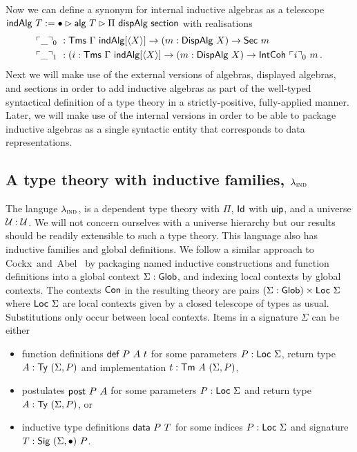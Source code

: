 Now we can define a synonym for internal inductive algebras as a telescope $\textsf{indAlg}\ T := \bullet \rhd \textsf{alg}\ T \rhd \Pi\ \textsf{dispAlg}\ \textsf{section}$
with realisations
\begin{align*}
    &\ulcorner \_ \urcorner_0\ : \textsf{Tms}\ \Gamma\ \textsf{indAlg}[\langle X\rangle] \to (m : \textsf{DispAlg}\ X) \to \textsf{Sec}\ m \\
    &\ulcorner \_ \urcorner_1\ : (i : \textsf{Tms}\ \Gamma\ \textsf{indAlg}[\langle X\rangle] \to (m : \textsf{DispAlg}\ X) \to \textsf{IntCoh}\ \ulcorner i \urcorner_0\ m \,.
\end{align*}
Next we will make use of the external versions of algebras, displayed algebras,
and sections in order to add inductive algebras as part of the well-typed
syntactical definition of a type theory in a strictly-positive, fully-applied
manner. Later, we will make use of the internal versions in order to be able to
package inductive algebras as a single syntactic entity that corresponds to data
representations.

\subsection{A type theory with inductive families, $\lambda_{\textsc{ind}}$}\label{sub:lambdaind}

The languge $\lambda_{\textsc{ind}}$, is a dependent type theory with $\Pi$, $\textsf{Id}$ with
$\textsf{uip}$, and a universe $\mathcal{U} : \mathcal{U}$. We will not concern ourselves with a
universe hierarchy but our results should be readily extensible to such a type
theory. This language also has inductive families and global definitions. We
follow a similar approach
to Cockx~and~Abel~\cite{Cockx2018-fk} by packaging named inductive constructions
and function definitions into a global context $\Sigma : \textsf{Glob}$, and indexing local contexts
by global contexts. The contexts $\textsf{Con}$ in the resulting theory are pairs $(\Sigma :
\textsf{Glob}) \times \textsf{Loc}\ \Sigma$ where $\textsf{Loc}\ \Sigma$ are local contexts given by a
closed telescope of types as usual. Substitutions only occur between local contexts.
Items in a signature $\Sigma$ can be either

\begin{itemize}
	\item function definitions $\mta{def}\ P\ A\ t$ for some parameters $P : \textsf{Loc}\
		      \Sigma$, return type $A : \textsf{Ty}\ (\Sigma, P)$ and implementation $t : \textsf{Tm}\ A\ (\Sigma, P)$,
	\item postulates $\textsf{post}\ P\ A$ for some parameters $P : \textsf{Loc}\
		      \Sigma$ and return type $A : \textsf{Ty}\ (\Sigma, P)$, or
	\item inductive type definitions $\mta{data}\ P\ T$ for some indices $P :
		      \textsf{Loc}\ \Sigma$ and signature $T : \textsf{Sig}\ (\Sigma, \bullet)\ P$.
\end{itemize}

